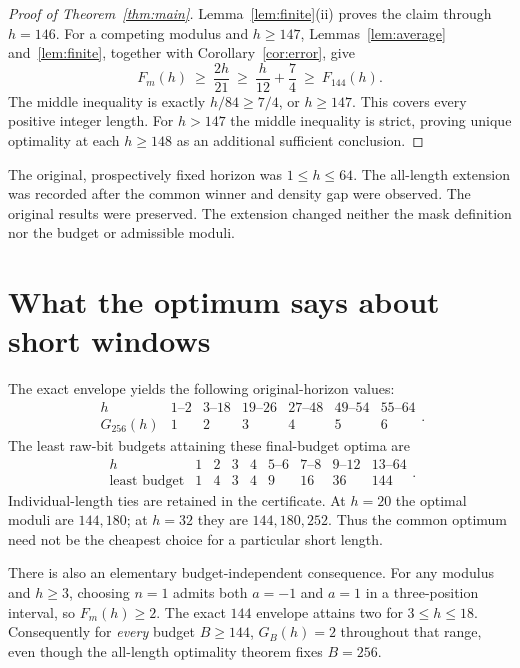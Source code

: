 \documentclass[11pt]{article}
\begin{document}
\begin{proof}[Proof of Theorem~\ref{thm:main}]
Lemma~\ref{lem:finite}(ii) proves the claim through $h=146$. For a competing
modulus and $h\ge147$, Lemmas~\ref{lem:average} and~\ref{lem:finite},
together with Corollary~\ref{cor:error}, give
\[
 F_m(h)\ \ge\ \frac{2h}{21}
 \ \ge\ \frac h{12}+\frac74
 \ \ge\ F_{144}(h).
\]
The middle inequality is exactly $h/84\ge7/4$, or $h\ge147$.
This covers every positive integer length. For $h>147$ the middle
inequality is strict, proving unique optimality at each $h\ge148$ as an
additional sufficient conclusion.
\end{proof}

The original, prospectively fixed horizon was $1\le h\le64$. The all-length
extension was recorded after the common winner and density gap were
observed. The original results were preserved. The extension changed
neither the mask definition nor the budget or admissible moduli.

\section{What the optimum says about short windows}

The exact envelope yields the following original-horizon values:
\[
\begin{array}{c|rrrrrr}
h&1\text{--}2&3\text{--}18&19\text{--}26&27\text{--}48&49\text{--}54&55\text{--}64\\\hline
G_{256}(h)&1&2&3&4&5&6
\end{array}.
\]
The least raw-bit budgets attaining these final-budget optima are
\[
\begin{array}{c|rrrrrrrr}
h&1&2&3&4&5\text{--}6&7\text{--}8&9\text{--}12&13\text{--}64\\\hline
\text{least budget}&1&4&3&4&9&16&36&144
\end{array}.
\]
Individual-length ties are retained in the certificate. At $h=20$ the
optimal moduli are $144,180$; at $h=32$ they are $144,180,252$. Thus the
common optimum need not be the cheapest choice for a particular short
length.

There is also an elementary budget-independent consequence. For any
modulus and $h\ge3$, choosing $n=1$ admits both $a=-1$ and $a=1$ in a
three-position interval, so $F_m(h)\ge2$. The exact $144$ envelope attains
two for $3\le h\le18$. Consequently for \emph{every} budget $B\ge144$,
$G_B(h)=2$ throughout that range, even though the all-length optimality
theorem fixes $B=256$.
\end{document}
